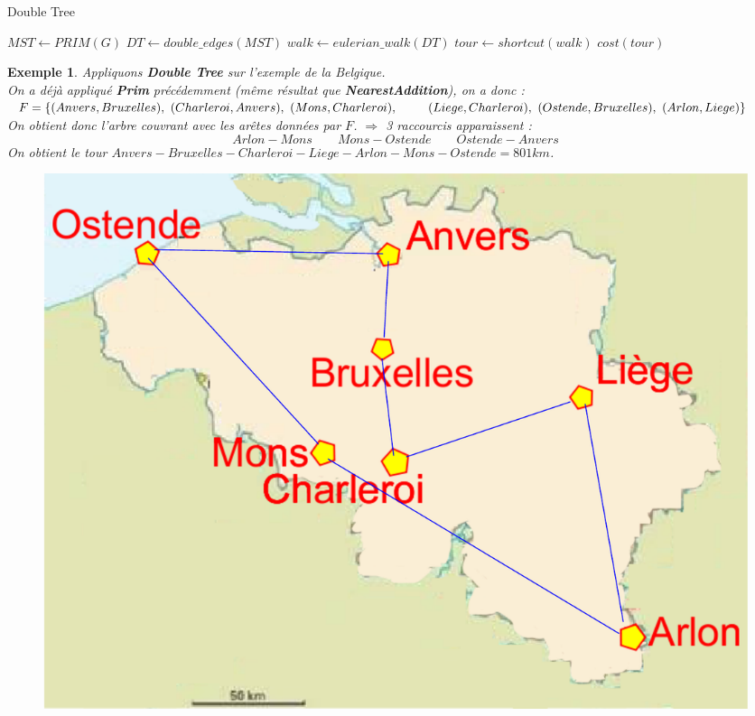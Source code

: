 \documentclass{article}
\newtheorem{exemple}{Exemple}[section]
\begin{document}
\begin{sffamily}
\begin{algorithm}[h!]
\caption{Double Tree}
\begin{algorithmic}[1]
\STATE $MST\leftarrow PRIM(G)$
\STATE $DT \leftarrow double\_edges(MST)$
\STATE $walk \leftarrow eulerian\_walk(DT)$
\STATE $tour \leftarrow shortcut(walk)$
\RETURN $cost(tour)$ 
\end{algorithmic}
\end{algorithm}

\begin{exemple} Appliquons \textbf{Double Tree} sur l'exemple de la Belgique. \\
On a déjà appliqué \textbf{Prim} précédemment (même résultat que \textbf{NearestAddition}), on a donc : \\
$	F = \{(Anvers,Bruxelles),\ (Charleroi, Anvers),\ (Mons, Charleroi),\ \\\indent\quad  (Liege, Charleroi),\ (Ostende, Bruxelles),\ (Arlon, 
Liege)\} $ \\
On obtient donc l'arbre couvrant avec les arêtes données par $F$. $\Rightarrow$ 3 raccourcis apparaissent : 
$$Arlon-Mons\qquad Mons-Ostende\qquad Ostende-Anvers$$
On obtient le tour $Anvers-Bruxelles-Charleroi-Liege-Arlon-Mons-Ostende = 801km$.
\begin{figure}[h!]
    \begin{center}
    \includegraphics[scale=0.28]{belgiqueDT.pdf}

\end{center}
\end{figure}
\end{exemple}
\end{sffamily}
\end{document}
